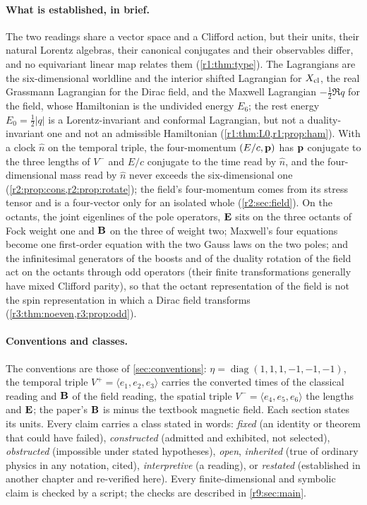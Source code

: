 \paragraph{What is established, in brief.} The two readings share a vector space and a Clifford action, but their units, their natural
Lorentz algebras, their canonical conjugates and their observables differ, and no equivariant linear map relates them
(\cref{r1:thm:type}). The Lagrangians are the six-dimensional worldline and the interior shifted Lagrangian for $X_{\rm cl}$, the real
Grassmann Lagrangian for the Dirac field, and the Maxwell Lagrangian $-\tfrac12\Re q$ for the field, whose Hamiltonian is the undivided
energy $E_6$; the rest energy $E_0=\tfrac12|q|$ is a Lorentz-invariant and conformal Lagrangian, but not a duality-invariant one and not an
admissible Hamiltonian (\cref{r1:thm:L0,r1:prop:ham}). With a clock $\hat n$ on the temporal triple, the four-momentum $(E/c,\mathbf p)$ has $\mathbf p$
conjugate to the three lengths of $V^-$ and $E/c$ conjugate to the time read by $\hat n$, and the four-dimensional mass read by $\hat n$ never exceeds
the six-dimensional one (\cref{r2:prop:cons,r2:prop:rotate}); the field's four-momentum comes from its stress tensor and is a four-vector
only for an isolated whole (\cref{r2:sec:field}). On the octants, the joint eigenlines of the pole operators, $\mathbf E$ sits on the three
octants of Fock weight one and $\mathbf B$ on the three of weight two; Maxwell's four equations become one first-order equation with the two
Gauss laws on the two poles; and the infinitesimal generators of the boosts and of the duality rotation of the field act on the octants
through odd operators (their finite transformations generally have mixed Clifford parity), so that
the octant representation of the field is not the spin representation in which a Dirac field transforms (\cref{r3:thm:noeven,r3:prop:odd}).

\paragraph{Conventions and classes.} The conventions are those of \cref{sec:conventions}: $\eta=\operatorname{diag}(1,1,1,\allowbreak-1,-1,-1)$, the temporal
triple $V^+=\langle e_1,e_2,e_3\rangle$ carries the converted times of the classical reading and $\mathbf B$ of the field reading, the spatial
triple $V^-=\langle e_4,e_5,e_6\rangle$ the lengths and $\mathbf E$; the paper's $\mathbf B$ is minus the textbook magnetic field. Each section states
its units. Every claim carries a class stated in words: \emph{fixed} (an identity or theorem that could have failed), \emph{constructed}
(admitted and exhibited, not selected), \emph{obstructed} (impossible under stated hypotheses), \emph{open}, \emph{inherited} (true of
ordinary physics in any notation, cited), \emph{interpretive} (a reading), or \emph{restated} (established in another chapter and re-verified here).
Every finite-dimensional and symbolic claim is checked by a script; the checks are described in \cref{r9:sec:main}.

